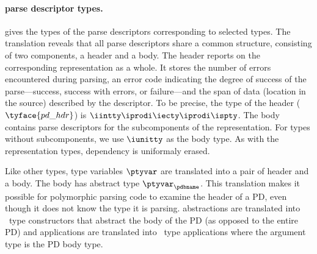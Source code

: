 \paragraph*{\ddc{} parse descriptor types.}
 gives the types of the parse descriptors
corresponding to selected \ddc{} types.  The translation reveals that
all parse descriptors share a common structure, consisting of two
components, a header and a body.  The header reports on the
corresponding representation as a whole. It stores the number of
errors encountered during parsing, an error code indicating the degree
of success of the parse---success, success with errors, or
failure---and the span of data (location in the source)  
described by the descriptor.  To be precise, the type
of the header ($\tyface{pd\_hdr}$) is $\iintty \iprodi \iecty \iprodi
\ispty$. The body contains parse descriptors for the subcomponents of
the representation. For types without subcomponents, we use $\iunitty$
as the body type.  As with the representation types, dependency is
uniformaly erased.



Like other types, \ddc{} type variables $\ptyvar$ are translated into 
a pair of header and a body.  The body has abstract type 
$\ptyvar_\pdbname$.
This translation makes it possible for polymorphic parsing code to examine the
header of a PD, even though it does not know the \ddc{} type it is parsing.
\ddc{} abstractions are translated into \fomega\ type constructors that
abstract the body of the PD (as opposed to the entire PD)
and \ddc{} applications are translated into \fomega\ type applications
where the argument type is the PD body type.

